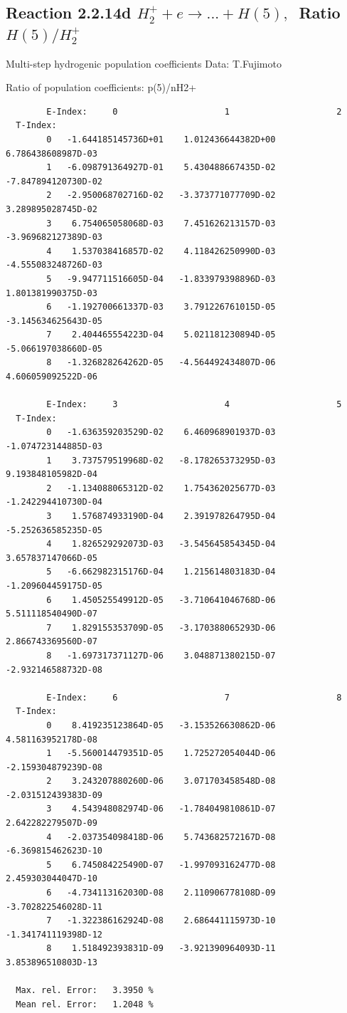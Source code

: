 \documentclass[12pt,dvips]{article}
\begin{document}
\subsection{
Reaction 2.2.14d $ H_2^+ + e \rightarrow ...+ H(5) , \   $
Ratio $H(5)/H_2^+  $
}

 Multi-step hydrogenic population coefficients
 Data: T.Fujimoto

 Ratio of population coefficients: p(5)/nH2+

\begin{small}\begin{verbatim}
        E-Index:     0                     1                     2
  T-Index:
        0   -1.644185145736D+01    1.012436644382D+00    6.786438608987D-03
        1   -6.098791364927D-01    5.430488667435D-02   -7.847894120730D-02
        2   -2.950068702716D-02   -3.373771077709D-02    3.289895028745D-02
        3    6.754065058068D-03    7.451626213157D-03   -3.969682127389D-03
        4    1.537038416857D-02    4.118426250990D-03   -4.555083248726D-03
        5   -9.947711516605D-04   -1.833979398896D-03    1.801381990375D-03
        6   -1.192700661337D-03    3.791226761015D-05   -3.145634625643D-05
        7    2.404465554223D-04    5.021181230894D-05   -5.066197038660D-05
        8   -1.326828264262D-05   -4.564492434807D-06    4.606059092522D-06

        E-Index:     3                     4                     5
  T-Index:
        0   -1.636359203529D-02    6.460968901937D-03   -1.074723144885D-03
        1    3.737579519968D-02   -8.178265373295D-03    9.193848105982D-04
        2   -1.134088065312D-02    1.754362025677D-03   -1.242294410730D-04
        3    1.576874933190D-04    2.391978264795D-04   -5.252636585235D-05
        4    1.826529292073D-03   -3.545645854345D-04    3.657837147066D-05
        5   -6.662982315176D-04    1.215614803183D-04   -1.209604459175D-05
        6    1.450525549912D-05   -3.710641046768D-06    5.511118540490D-07
        7    1.829155353709D-05   -3.170388065293D-06    2.866743369560D-07
        8   -1.697317371127D-06    3.048871380215D-07   -2.932146588732D-08

        E-Index:     6                     7                     8
  T-Index:
        0    8.419235123864D-05   -3.153526630862D-06    4.581163952178D-08
        1   -5.560014479351D-05    1.725272054044D-06   -2.159304879239D-08
        2    3.243207880260D-06    3.071703458548D-08   -2.031512439383D-09
        3    4.543948082974D-06   -1.784049810861D-07    2.642282279507D-09
        4   -2.037354098418D-06    5.743682572167D-08   -6.369815462623D-10
        5    6.745084225490D-07   -1.997093162477D-08    2.459303044047D-10
        6   -4.734113162030D-08    2.110906778108D-09   -3.702822546028D-11
        7   -1.322386162924D-08    2.686441115973D-10   -1.341741119398D-12
        8    1.518492393831D-09   -3.921390964093D-11    3.853896510803D-13

  Max. rel. Error:   3.3950 %
  Mean rel. Error:   1.2048 %

\end{verbatim}\end{small}
\end{document}
